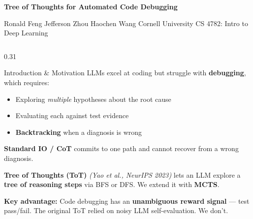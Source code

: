 \documentclass[final]{beamer}
\begin{document}
\begin{frame}[t]{}


\vspace{0.5cm}
\centering
{\fontsize{56}{64}\bfseries\color{white}\selectfont
  Tree of Thoughts for Automated Code Debugging\par}
\vspace{1.5cm}
{\fontsize{30}{36}\color{white}\selectfont
  Ronald Feng \quad Jefferson Zhou \quad Haochen Wang
  \quad\textbullet\quad Cornell University
  \quad\textbullet\quad CS 4782: Intro to Deep Learning\par}
\vspace{1.5cm}

\begin{columns}[t,totalwidth=\textwidth]

\begin{column}{0.31\textwidth}

\begin{block}{Introduction \& Motivation}
LLMs excel at coding but struggle with \textbf{debugging}, which requires:
\begin{itemize}
\setlength{\itemsep}{2pt}
  \item Exploring \emph{multiple} hypotheses about the root cause
  \item Evaluating each against test evidence
  \item \textbf{Backtracking} when a diagnosis is wrong
\end{itemize}
\vspace{0.4cm}
\textbf{Standard IO / CoT} commits to one path and cannot recover from a wrong diagnosis.
\vspace{0.4cm}

\textbf{Tree of Thoughts (ToT)} \textit{(Yao et al., NeurIPS 2023)} lets an LLM explore a \textbf{tree of reasoning steps} via BFS or DFS. We extend it with \textbf{MCTS}.
\vspace{0.4cm}

\textcolor{accentblue}{\textbf{Key advantage:}} Code debugging has an \textbf{unambiguous reward signal} --- test pass/fail. The original ToT relied on noisy LLM self-evaluation. We don't.
\vspace{0.4cm}


\end{block}
\end{column}
\end{columns}
\end{frame}
\end{document}

